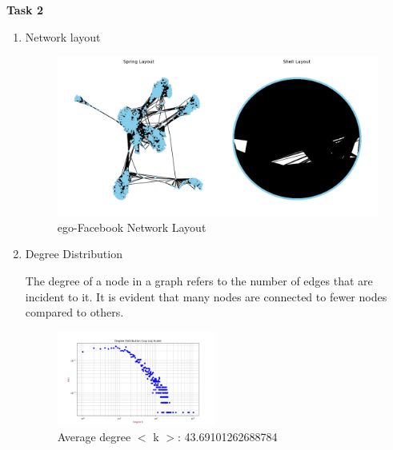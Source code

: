 \documentclass[10pt,letterpaper, onecolumn]{report}
\begin{document}
\begin{flushleft}
    \textbf{Task 2}
    \hfill\break
    \setlength{\parindent}{1.5em} %
    \setlength{\parskip}{0.5em}   %

    \begin{enumerate}[label=(\alph*)]
        \item Network layout
        
        \begin{figure}[htbp!] %
            \centering
            \includegraphics[width=1\textwidth]{../network_layouts.png} %
            \caption{ego-Facebook Network Layout} %
        \end{figure}

        \item Degree Distribution
        
        The degree of a node in a graph refers to the number of edges that are incident to it. It is evident that many nodes are connected to fewer nodes compared to others.
        \begin{figure}[htbp!] %
            \centering
            \includegraphics[width=0.49\textwidth]{../degree_distribution.png} %
            \caption{Average degree $<$ k $>$: 43.69101262688784} %
        \end{figure}


\end{enumerate}
\end{flushleft}
\end{document}
